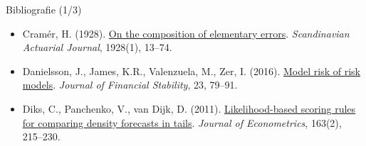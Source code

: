 \begin{frame}{Bibliografie (1/3)}
\begin{itemize}
    \item Cramér, H. (1928). \href{https://doi.org/10.1080/03461238.1928.10416862}{On the composition of elementary errors}. \textit{Scandinavian Actuarial Journal}, 1928(1), 13--74.
    \item Danielsson, J., James, K.R., Valenzuela, M., Zer, I. (2016). \href{https://doi.org/10.1016/j.jfs.2016.02.002}{Model risk of risk models}. \textit{Journal of Financial Stability}, 23, 79--91.
    \item Diks, C., Panchenko, V., van Dijk, D. (2011). \href{https://doi.org/10.1016/j.jeconom.2011.04.001}{Likelihood-based scoring rules for comparing density forecasts in tails}. \textit{Journal of Econometrics}, 163(2), 215--230.
\end{itemize}
\end{frame}


